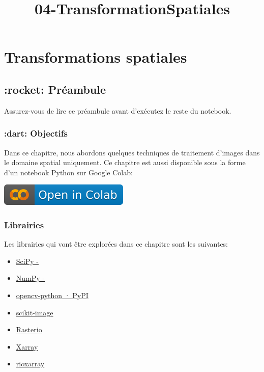 \documentclass[11pt]{article}
\title{04-TransformationSpatiales}
\begin{document}
    
    \maketitle
    
    

    
    \hypertarget{sec-chap04}{%
\section{Transformations spatiales}\label{sec-chap04}}

\hypertarget{rocket-pruxe9ambule}{%
\subsection{:rocket: Préambule}\label{rocket-pruxe9ambule}}

Assurez-vous de lire ce préambule avant d'exécutez le reste du notebook.

\hypertarget{dart-objectifs}{%
\subsubsection{:dart: Objectifs}\label{dart-objectifs}}

Dans ce chapitre, nous abordons quelques techniques de traitement
d'images dans le domaine spatial uniquement. Ce chapitre est aussi
disponible sous la forme d'un notebook Python sur Google Colab:

\href{https://colab.research.google.com/github/sfoucher/TraitementImagesPythonVol1/blob/main/notebooks/04-TransformationSpatiales.ipynb}{\includegraphics{images/colab-badge.svg}}

\hypertarget{librairies}{%
\subsubsection{Librairies}\label{librairies}}

Les librairies qui vont être explorées dans ce chapitre sont les
suivantes:

\begin{itemize}
\item
  \href{https://scipy.org/}{SciPy -}
\item
  \href{https://numpy.org/}{NumPy -}
\item
  \href{https://pypi.org/project/opencv-python/}{opencv-python · PyPI}
\item
  \href{https://scikit-image.org/}{scikit-image}
\item
  \href{https://rasterio.readthedocs.io/en/stable/}{Rasterio}
\item
  \href{https://docs.xarray.dev/en/stable/}{Xarray}
\item
  \href{https://corteva.github.io/rioxarray/stable/index.html}{rioxarray}
\end{itemize}
\end{document}
